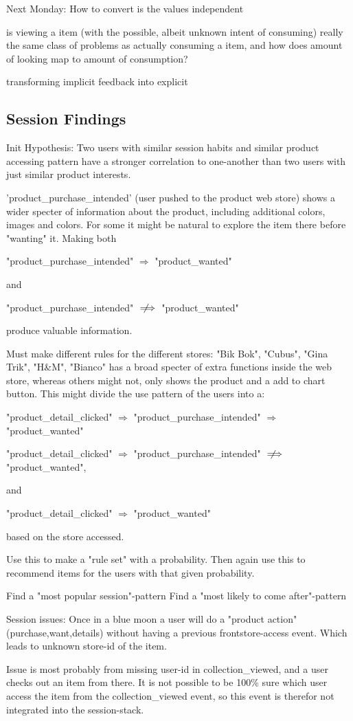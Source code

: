      Next Monday:
        How to convert
        is the values independent

    is viewing a item (with the possible, albeit unknown intent of consuming) really the same class of problems as actually consuming a item, and how does amount of looking map to amount of consumption?

    transforming implicit feedback into explicit

\subsection{Session Findings}
    Init Hypothesis:
    Two users with similar session habits and similar product accessing pattern
    have a stronger correlation to one-another than two users with just similar
    product interests.


    'product\_purchase\_intended' (user pushed to the product web store) shows a
    wider specter of information about the product, including additional colors,
    images and colors.  For some it might be natural to explore the item there
    before "wanting" it. Making both

    "product\_purchase\_intended" $\Rightarrow$ "product\_wanted"

    and

    "product\_purchase\_intended" $\notimplies$ "product\_wanted"

    produce valuable information.

    Must make different rules for the different stores:
    "Bik Bok", "Cubus", "Gina Trik", "H\&M", "Bianco" has a broad specter of extra
    functions inside the web store, whereas others might not, only shows the
    product and a add to chart button.  This might divide the use pattern of the
    users into a:

    "product\_detail\_clicked" $\Rightarrow$ "product\_purchase\_intended" $\Rightarrow$ "product\_wanted"

    "product\_detail\_clicked" $\Rightarrow$ "product\_purchase\_intended" $\notimplies$ "product\_wanted",

    and

    "product\_detail\_clicked" $\Rightarrow$ "product\_wanted"

    based on the store accessed.

    Use this to make a "rule set" with a probability.
    Then again use this to recommend items for the users with that given
    probability.

    Find a "most popular session"-pattern
    Find a "most likely to come after"-pattern

    Session issues:
    Once in a blue moon a user will do a "product action" (purchase,want,details)
    without having a previous frontstore-access event. Which leads to unknown
    store-id of the item.

    Issue is most probably from missing user-id in collection\_viewed, and a user
    checks out an item from there. It is not possible to be 100\% sure which user
    access the item from the collection\_viewed event, so this event is therefor
    not integrated into the session-stack.
